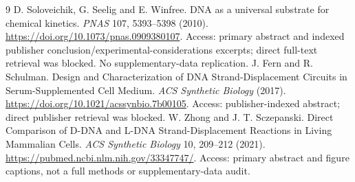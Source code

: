 \begin{thebibliography}{9}
 D. Soloveichik, G. Seelig and E. Winfree.
DNA as a universal substrate for chemical kinetics.
\emph{PNAS} 107, 5393--5398 (2010).
\url{https://doi.org/10.1073/pnas.0909380107}.
Access: primary abstract and indexed publisher conclusion/experimental-considerations
excerpts; direct full-text retrieval was blocked. No supplementary-data replication.
 J. Fern and R. Schulman.
Design and Characterization of DNA Strand-Displacement Circuits in
Serum-Supplemented Cell Medium. \emph{ACS Synthetic Biology} (2017).
\url{https://doi.org/10.1021/acssynbio.7b00105}.
Access: publisher-indexed abstract; direct publisher retrieval was blocked.
 W. Zhong and J. T. Sczepanski.
Direct Comparison of D-DNA and L-DNA Strand-Displacement Reactions in Living
Mammalian Cells. \emph{ACS Synthetic Biology} 10, 209--212 (2021).
\url{https://pubmed.ncbi.nlm.nih.gov/33347747/}.
Access: primary abstract and figure captions, not a full methods or supplementary-data audit.
\end{thebibliography}
